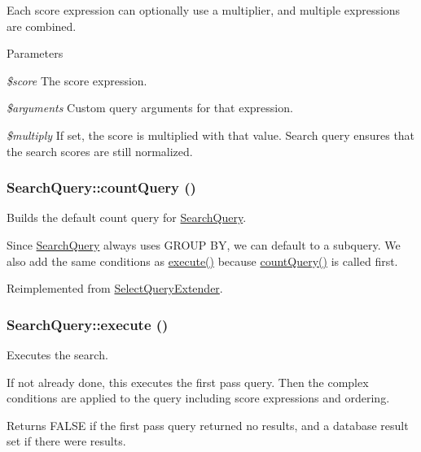 Each score expression can optionally use a multiplier, and multiple expressions are combined.


\begin{DoxyParams}{Parameters}
\item[{\em \$score}]The score expression. \item[{\em \$arguments}]Custom query arguments for that expression. \item[{\em \$multiply}]If set, the score is multiplied with that value. Search query ensures that the search scores are still normalized. \end{DoxyParams}
\hypertarget{classSearchQuery_a01dea1649b1e99312abf12760b1b89e2}{
\subsubsection[{countQuery}]{\setlength{\rightskip}{0pt plus 5cm}SearchQuery::countQuery ()}}
\label{classSearchQuery_a01dea1649b1e99312abf12760b1b89e2}
Builds the default count query for \hyperlink{classSearchQuery}{SearchQuery}.

Since \hyperlink{classSearchQuery}{SearchQuery} always uses GROUP BY, we can default to a subquery. We also add the same conditions as \hyperlink{classSearchQuery_acedd13d6590d0013488873ec33fc6482}{execute()} because \hyperlink{classSearchQuery_a01dea1649b1e99312abf12760b1b89e2}{countQuery()} is called first. 

Reimplemented from \hyperlink{classSelectQueryExtender_a4c222f9407cc787f41b49be4b8ee26a5}{SelectQueryExtender}.\hypertarget{classSearchQuery_acedd13d6590d0013488873ec33fc6482}{
\subsubsection[{execute}]{\setlength{\rightskip}{0pt plus 5cm}SearchQuery::execute ()}}
\label{classSearchQuery_acedd13d6590d0013488873ec33fc6482}
Executes the search.

If not already done, this executes the first pass query. Then the complex conditions are applied to the query including score expressions and ordering.

\begin{DoxyReturn}{Returns}
FALSE if the first pass query returned no results, and a database result set if there were results. 
\end{DoxyReturn}


